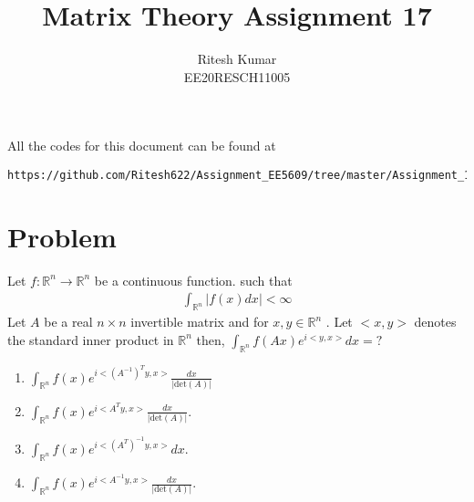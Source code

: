 \documentclass[journal,12pt,twocolumn]{IEEEtran}
\numberwithin{table}{section}
\begin{document}
     \def\rightbox#1{\makebox[0in][r]{#1}}
     \def\centbox#1{\makebox[0in]{#1}}
     \def\topbox#1{\raisebox{-\baselineskip}[0in][0in]{#1}}
     \def\midbox#1{\raisebox{-0.5\baselineskip}[0in][0in]{#1}}
\vspace{3cm}
\title{Matrix Theory Assignment 17}
\author{Ritesh Kumar \\ EE20RESCH11005}
\maketitle
\newpage
\bigskip
\renewcommand{\thefigure}{\theenumi}
\renewcommand{\thetable}{\theenumi}
All the codes for this document can be found at
%
\begin{lstlisting}
https://github.com/Ritesh622/Assignment_EE5609/tree/master/Assignment_17
\end{lstlisting}
%
	\section{Problem}
Let $f : \mathbb{R}^n  \rightarrow \mathbb{R}^n $ be a continuous  function. such that
\begin{align}
\int_{\mathbb{R}^n} \left | f(x)dx \right | < \infty
\end{align}
Let $A$ be a real $n  \times n$ invertible matrix and  for $x,y \in \mathbb{R}^n$ . Let $<x,y>$ denotes the standard inner product in $\mathbb{R}^n$ then,
$\int_{\mathbb{R}^n} f(Ax) e^{i<y,x>} dx  = ?$ \\



\begin{enumerate}
\item$\int_{\mathbb{R}^n} f(x) e^{i<(A^{-1})^{T}y,x>} \frac{dx}{\left | \text{det} (A) \right |} $\\
\item $\int_{\mathbb{R}^n} f(x) e^{i<A^{T}y,x>} \frac{dx}{\left | \text{det} (A) \right |} $.\\
\item$\int_{\mathbb{R}^n} f(x) e^{i<(A^{T})^{-1}y,x>}dx $.\\
\item $\int_{\mathbb{R}^n} f(x) e^{i<A^{-1}y,x>} \frac{dx}{\left | \text{det} (A) \right |} $.\\
\end{enumerate}
\end{document}
